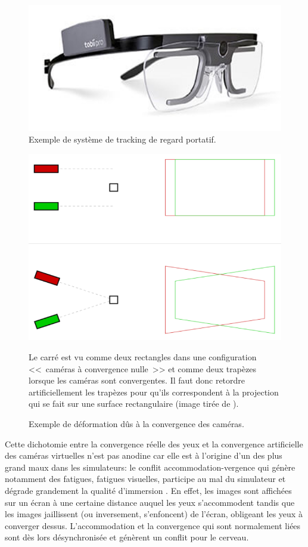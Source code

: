 	\begin{figure}
		\centering
		\includegraphics[scale=1]{Figures/EyeTrackerTobii}
		\caption{Exemple de système de tracking de regard portatif.}
		\label{fig:eye_tracker}
	\end{figure}
	
	\begin{figure}
		\centering
		\includegraphics[scale=.75]{Figures/RedressementPlansVision}
		\caption{Exemple de déformation dûs à la convergence des caméras.}{Le carré est vu comme deux rectangles dans une configuration <<~caméras à convergence nulle~>> et comme deux trapèzes lorsque les caméras sont convergentes. Il faut donc retordre artificiellement les trapèzes pour qu'ils correspondent à la projection qui se fait sur une surface rectangulaire (image tirée de \citep{aurat_immersion_2016}).}
		\label{fig:redressement_plan_vision}
	\end{figure}
	
	\par Cette dichotomie entre la convergence réelle des yeux et la convergence artificielle des caméras virtuelles n'est pas anodine car elle est à l'origine d'un des plus grand maux dans les simulateurs: le conflit accommodation-vergence qui génère notamment des fatigues, fatigues visuelles, participe au mal du simulateur et dégrade grandement la qualité d'immersion \citep{neveu_impact_2012}. En effet, les images sont affichées sur un écran à une certaine distance auquel les yeux s'accommodent tandis que les images jaillissent (ou inversement, s'enfoncent) de l'écran, obligeant les yeux à converger dessus. L'accommodation et la convergence qui sont normalement liées sont dès lors désynchronisée et génèrent un conflit pour le cerveau.
	
